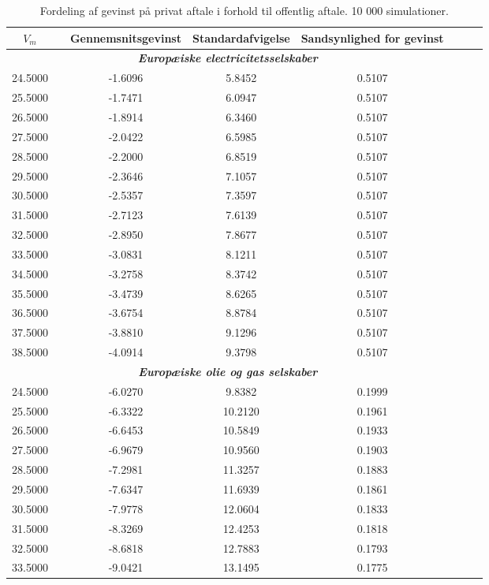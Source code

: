 \documentclass{article}
\begin{document}
\begin{table}[h]
	\caption{Fordeling af gevinst p\aa{} privat aftale i forhold til offentlig aftale. 10 000 simulationer.}
	\label{tab:rel_fordeling}
	\begin{tabularx}{0.95\linewidth}{cXcccccr}
	\toprule[1pt]
	$V_m$ && Gennemsnitsgevinst & Standardafvigelse & Sandsynlighed for gevinst\\
	\hline
\multicolumn{5}{c}{\emph{\textbf{Europæiske electricitetsselskaber}}} \\ 
24.5000&&-1.6096& 5.8452& 0.5107\\
25.5000&&-1.7471& 6.0947& 0.5107\\
26.5000&&-1.8914& 6.3460& 0.5107\\
27.5000&&-2.0422& 6.5985& 0.5107\\
28.5000&&-2.2000& 6.8519& 0.5107\\
29.5000&&-2.3646& 7.1057& 0.5107\\
30.5000&&-2.5357& 7.3597& 0.5107\\
31.5000&&-2.7123& 7.6139& 0.5107\\
32.5000&&-2.8950& 7.8677& 0.5107\\
33.5000&&-3.0831& 8.1211& 0.5107\\
34.5000&&-3.2758& 8.3742& 0.5107\\
35.5000&&-3.4739& 8.6265& 0.5107\\
36.5000&&-3.6754& 8.8784& 0.5107\\
37.5000&&-3.8810& 9.1296& 0.5107\\
38.5000&&-4.0914& 9.3798& 0.5107\\
\multicolumn{5}{c}{\emph{\textbf{Europæiske olie og gas selskaber}}} \\
24.5000&&-6.0270& 9.8382& 0.1999\\
25.5000&&-6.3322&10.2120& 0.1961\\
26.5000&&-6.6453&10.5849& 0.1933\\
27.5000&&-6.9679&10.9560& 0.1903\\
28.5000&&-7.2981&11.3257& 0.1883\\
29.5000&&-7.6347&11.6939& 0.1861\\
30.5000&&-7.9778&12.0604& 0.1833\\
31.5000&&-8.3269&12.4253& 0.1818\\
32.5000&&-8.6818&12.7883& 0.1793\\
33.5000&&-9.0421&13.1495& 0.1775\\

\end{tabularx}
\end{table}
\end{document}
